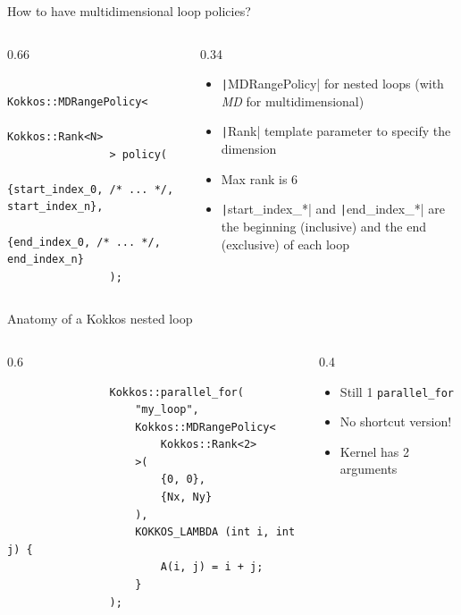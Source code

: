 \documentclass[
    aspectratio=169,
    \createHandout
]{beamer}
\begin{document}
\begin{frame}[fragile]{How to have multidimensional loop policies?}
    \begin{columns}
        \begin{column}{0.66\linewidth}
            \begin{verbatim}
                Kokkos::MDRangePolicy<
                    Kokkos::Rank<N>
                > policy(
                    {start_index_0, /* ... */, start_index_n},
                    {end_index_0, /* ... */, end_index_n}
                );
            \end{verbatim}
        \end{column}
        \begin{column}{0.34\linewidth}
            \begin{itemize}
                \item \texttt|MDRangePolicy| for nested loops (with \emph{MD} for multidimensional)
                \item \texttt|Rank| template parameter to specify the dimension
                \item Max rank is 6
                \item \texttt|start_index_*| and \texttt|end_index_*| are the beginning (inclusive) and the end (exclusive) of each loop
            \end{itemize}
        \end{column}
    \end{columns}
\end{frame}


\begin{frame}[fragile]{Anatomy of a Kokkos nested loop}
    \begin{columns}
        \begin{column}{0.6\linewidth}
            \begin{verbatim}
                Kokkos::parallel_for(
                    "my_loop",
                    Kokkos::MDRangePolicy<
                        Kokkos::Rank<2>
                    >(
                        {0, 0},
                        {Nx, Ny}
                    ),
                    KOKKOS_LAMBDA (int i, int j) {
                        A(i, j) = i + j;
                    }
                );
            \end{verbatim}
        \end{column}
        \begin{column}{0.4\linewidth}
            \begin{itemize}
                \item Still 1 \texttt{parallel\_for}
                \item No shortcut version!
                \item Kernel has 2 arguments
            \end{itemize}
        \end{column}
    \end{columns}
\end{frame}
\end{document}
